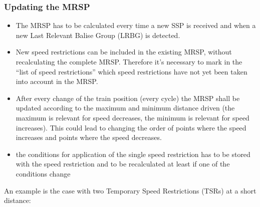 \subsubsection{Updating the MRSP}
\begin{itemize}
\item The MRSP has to be calculated every time a new SSP is received and when a new Last Relevant Balise Group (LRBG) is detected.
\item New speed restrictions can be included in the existing MRSP, without recalculating the complete MRSP. Therefore it's necessary to mark in the “list of speed restrictions” which speed restrictions have not yet been taken into account in the MRSP.
\item After every change of the train position (every cycle) the MRSP shall be updated according to the maximum and minimum distance driven (the maximum is relevant for speed decreases, the minimum is relevant for speed increases). This could lead to changing the order of points where the speed increases and points where the speed decreases.
\item the conditions for application of the single speed restriction has to be stored with the speed restriction and to be recalculated at least if one of the conditions change
\end{itemize}

An example is the case with two Temporary Speed Restrictions (TSRs) at a short distance:  

